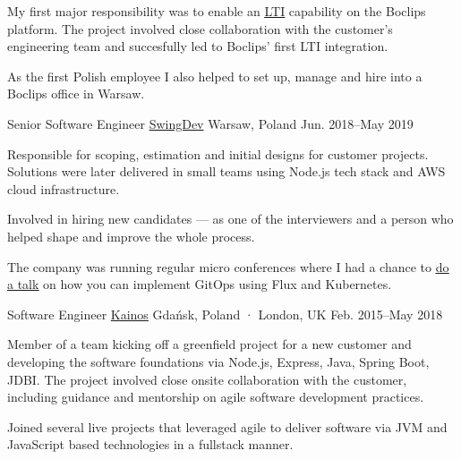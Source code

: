 \begin{cventries}
{{\begin{cvitems}
            \item {My first major responsibility was to enable an \href{https://www.imsglobal.org/activity/learning-tools-interoperability}{\underline{LTI}} capability on the Boclips platform. The project involved close collaboration with the customer's engineering team and succesfully led to Boclips' first LTI integration.}
            \item {As the first Polish employee I also helped to set up, manage and hire into a Boclips office in Warsaw.}
          \end{cvitems}
        }
    }

  \cventry
    {Senior Software Engineer} %
    {\href{https://www.swing.dev}{SwingDev}} %
    {Warsaw, Poland} %
    {Jun. 2018–May 2019} %
    {
      \begin {cvitems} %
        \item {Responsible for scoping, estimation and initial designs for customer projects. Solutions were later delivered in small teams using Node.js tech stack and AWS cloud infrastructure.}
        \item {Involved in hiring new candidates — as one of the interviewers and a person who helped shape and improve the whole process.}
        \item {The company was running regular micro conferences where I had a chance to \href{https://www.youtube.com/watch?v=5zt-jzKHwX8}{\underline{do a talk}} on how you can implement GitOps using Flux and Kubernetes.}
      \end {cvitems}
    }

  \cventry
    {Software Engineer} %
    {\href{https://www.kainos.com}{Kainos}} %
    {Gdańsk, Poland · London, UK} %
    {Feb. 2015–May 2018} %
    {
      \begin{cvitems} %
        \item {Member of a team kicking off a greenfield project for a new customer and developing the software foundations via Node.js, Express, Java, Spring Boot, JDBI. The project involved close onsite collaboration with the customer, including guidance and mentorship on agile software development practices.}
        \item {Joined several live projects that leveraged agile to deliver software via JVM and JavaScript based technologies in a fullstack manner.}
      \end{cvitems}
    }


\end{cventries}
